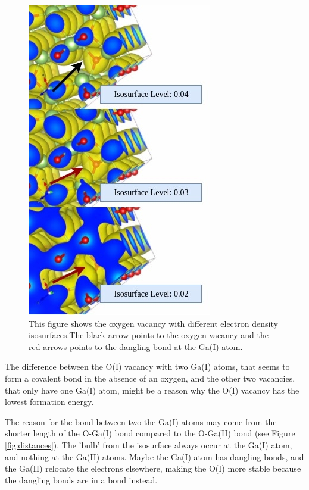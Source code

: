 \begin{figure}[H]
\includegraphics[width=0.7\linewidth]{../fig/isosurfaces/O_III/isosurface}\caption{This figure shows the oxygen vacancy with different electron density isosurfaces.The black arrow points to the oxygen vacancy and the red arrows points to the dangling bond at the Ga(I) atom.}\label{fig:isosurface_O_III}
\end{figure}

The difference between the O(I) vacancy with two Ga(I) atoms, that seems to form a covalent bond in the absence of an oxygen, and the other two vacancies, that only have one Ga(I) atom, might be a reason why the O(I) vacancy has the lowest formation energy.

The reason for the bond between two the Ga(I) atoms may come from the shorter length of the O-Ga(I) bond compared to the O-Ga(II) bond (see Figure \ref{fig:distances}). The 'bulb' from the isosurface always occur at the Ga(I) atom, and nothing at the Ga(II) atoms. Maybe the Ga(I) atom has dangling bonds, and the Ga(II) relocate the electrons elsewhere, making the O(I) more stable because the dangling bonds are in a bond instead. 

